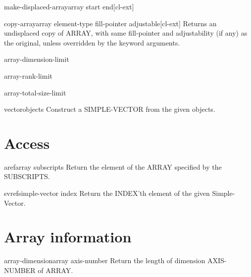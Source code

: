 \documentclass[10pt,english]{book}
\begin{document}
\begin{function}{make-displaced-array}{array \op start end}[cl-ext]
  
\end{function}

\begin{function}{copy-array}{array \key element-type fill-pointer adjustable}[cl-ext]
  Returns an undisplaced copy of ARRAY, with same fill-pointer
and adjustability (if any) as the original, unless overridden by
the keyword arguments.
\end{function}

\begin{constant}{array-dimension-limit}{}
  
\end{constant}

\begin{constant}{array-rank-limit}{}
  
\end{constant}

\begin{constant}{array-total-size-limit}{}
  
\end{constant}

\begin{function}{vector}{\rest objects}
  Construct a SIMPLE-VECTOR from the given objects.
\end{function}

\section{Access}
\label{sec:array-access}

\begin{accessor}{aref}{array \rest subscripts}
  Return the element of the ARRAY specified by the SUBSCRIPTS.
\end{accessor}

\begin{accessor}{svref}{simple-vector index}
  Return the INDEX'th element of the given Simple-Vector.
\end{accessor}

\section{Array information}
\label{sec:array-information}

\begin{function}{array-dimension}{array axis-number}
  Return the length of dimension AXIS-NUMBER of ARRAY.
\end{function}
\end{document}
